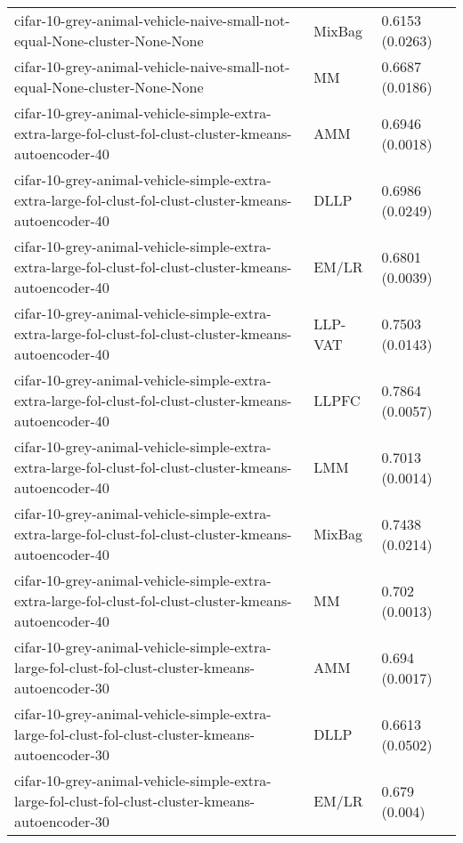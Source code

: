 \begin{longtable}{lll}
                                    cifar-10-grey-animal-vehicle-naive-small-not-equal-None-cluster-None-None &    MixBag &                           0.6153 (0.0263) \\
                                    cifar-10-grey-animal-vehicle-naive-small-not-equal-None-cluster-None-None &        MM &                           0.6687 (0.0186) \\
      cifar-10-grey-animal-vehicle-simple-extra-extra-large-fol-clust-fol-clust-cluster-kmeans-autoencoder-40 &       AMM &                           0.6946 (0.0018) \\
      cifar-10-grey-animal-vehicle-simple-extra-extra-large-fol-clust-fol-clust-cluster-kmeans-autoencoder-40 &      DLLP &                           0.6986 (0.0249) \\
      cifar-10-grey-animal-vehicle-simple-extra-extra-large-fol-clust-fol-clust-cluster-kmeans-autoencoder-40 &     EM/LR &                           0.6801 (0.0039) \\
      cifar-10-grey-animal-vehicle-simple-extra-extra-large-fol-clust-fol-clust-cluster-kmeans-autoencoder-40 &   LLP-VAT &                           0.7503 (0.0143) \\
      cifar-10-grey-animal-vehicle-simple-extra-extra-large-fol-clust-fol-clust-cluster-kmeans-autoencoder-40 &     LLPFC &                           0.7864 (0.0057) \\
      cifar-10-grey-animal-vehicle-simple-extra-extra-large-fol-clust-fol-clust-cluster-kmeans-autoencoder-40 &       LMM &                           0.7013 (0.0014) \\
      cifar-10-grey-animal-vehicle-simple-extra-extra-large-fol-clust-fol-clust-cluster-kmeans-autoencoder-40 &    MixBag &                           0.7438 (0.0214) \\
      cifar-10-grey-animal-vehicle-simple-extra-extra-large-fol-clust-fol-clust-cluster-kmeans-autoencoder-40 &        MM &                            0.702 (0.0013) \\
            cifar-10-grey-animal-vehicle-simple-extra-large-fol-clust-fol-clust-cluster-kmeans-autoencoder-30 &       AMM &                            0.694 (0.0017) \\
            cifar-10-grey-animal-vehicle-simple-extra-large-fol-clust-fol-clust-cluster-kmeans-autoencoder-30 &      DLLP &                           0.6613 (0.0502) \\
            cifar-10-grey-animal-vehicle-simple-extra-large-fol-clust-fol-clust-cluster-kmeans-autoencoder-30 &     EM/LR &                             0.679 (0.004) \\

\end{longtable}
